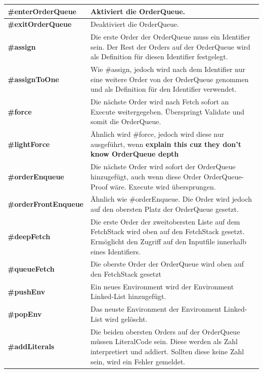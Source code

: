 \begin{table}[H]
    \centering
    \begin{tabularx}{\textwidth}{l|X}
    \textbf{\#enterOrderQueue}      & Aktiviert die OrderQueue. \\ \hline
    \textbf{\#exitOrderQueue}       & Deaktiviert die OrderQueue. \\ \hline
    \textbf{\#assign}               & Die erste Order der OrderQueue muss ein Identifier sein. Der Rest der Orders auf der OrderQueue wird als Definition für diesen Identifier festgelegt. \\ \hline
    \textbf{\#assignToOne}          & Wie \#assign, jedoch wird nach dem Identifier nur eine weitere Order von der OrderQueue genommen und als Definition für den Identifier verwendet. \\ \hline
    \textbf{\#force}                & Die nächste Order wird nach Fetch sofort an Execute weitergegeben. Überspringt Validate und somit die OrderQueue. \\ \hline
    \textbf{\#lightForce}           & Ähnlich wird \#force, jedoch wird diese nur ausgeführt, wenn \textbf{explain this cuz they don't know OrderQueue depth} \\ \hline
    \textbf{\#orderEnqueue}         & Die nächste Order wird sofort der OrderQueue hinzugefügt, auch wenn diese Order OrderQueue-Proof wäre. Execute wird übersprungen. \\ \hline
    \textbf{\#orderFrontEnqueue}    & Ähnlich wie \#orderEnqueue. Die Order wird jedoch auf den obersten Platz der OrderQueue gesetzt. \\ \hline
    \textbf{\#deepFetch}            & Die erste Order der zweitobersten Liste auf dem FetchStack wird oben auf den FetchStack gesetzt. Ermöglicht den Zugriff auf den Inputfile innerhalb eines Identifiers. \\ \hline
    \textbf{\#queueFetch}           & Die oberste Order der OrderQueue wird oben auf den FetchStack gesetzt \\ \hline 
    \textbf{\#pushEnv}              & Ein neues Environment wird der Environment Linked-List hinzugefügt. \\ \hline
    \textbf{\#popEnv}               & Das neuste Environment der Environment Linked-List wird gelöscht. \\ \hline
    \textbf{\#addLiterals}          & Die beiden obersten Orders auf der OrderQueue müssen LiteralCode sein. Diese werden als Zahl interpretiert und addiert. Sollten diese keine Zahl sein, wird ein Fehler gemeldet.        
    \end{tabularx}
\end{table}

